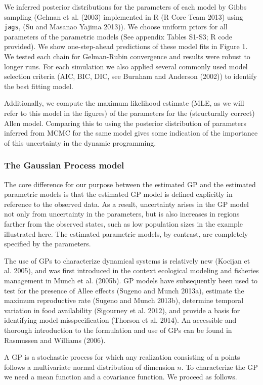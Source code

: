 \documentclass[author-year, 12pt,review]{components/elsarticle} %
\begin{document}
We inferred posterior distributions for the parameters of each model by
Gibbs sampling (Gelman et al. (2003) implemented in R (R Core Team 2013)
using \texttt{jags}, (Su and Masanao Yajima 2013)). We choose uniform
priors for all parameters of the parametric models (See appendix Tables
S1-S3; R code provided). We show one-step-ahead predictions of these
model fits in Figure 1. We tested each chain for Gelman-Rubin
convergence and results were robust to longer runs. For each simulation
we also applied several commonly used model selection criteria (AIC,
BIC, DIC, see Burnham and Anderson (2002)) to identify the best fitting
model.

Additionally, we compute the maximum likelihood estimate (MLE, as we
will refer to this model in the figures) of the parameters for the
(structurally correct) Allen model. Comparing this to using the
posterior distribution of parameters inferred from MCMC for the same
model gives some indication of the importance of this uncertainty in the
dynamic programming.

\subsubsection{The Gaussian Process
model}\label{the-gaussian-process-model}

The core difference for our purpose between the estimated GP and the
estimated parametric models is that the estimated GP model is defined
explicitly in reference to the observed data. As a result, uncertainty
arises in the GP model not only from uncertainty in the parameters, but
is also increases in regions farther from the observed states, such as
low population sizes in the example illustrated here. The estimated
parametric models, by contrast, are completely specified by the
parameters.

The use of GPs to characterize dynamical systems is relatively new
(Kocijan et al. 2005), and was first introduced in the context
ecological modeling and fisheries management in Munch et al. (2005b). GP
models have subsequently been used to test for the presence of Allee
effects (Sugeno and Munch 2013a), estimate the maximum reproductive rate
(Sugeno and Munch 2013b), determine temporal variation in food
availability (Sigourney et al. 2012), and provide a basis for
identifying model-misspecification (Thorson et al. 2014). An accessible
and thorough introduction to the formulation and use of GPs can be found
in Rasmussen and Williams (2006).

A GP is a stochastic process for which any realization consisting of n
points follows a multivariate normal distribution of dimension $n$. To
characterize the GP we need a mean function and a covariance function.
We proceed as follows.
\end{document}
